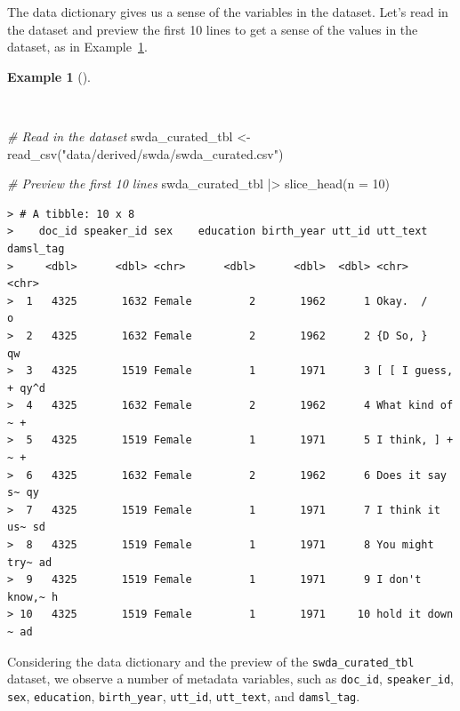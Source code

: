 \documentclass[
  letterpaper,
  DIV=11,
  numbers=noendperiod]{scrreport}
\newenvironment{Shaded}{\begin{snugshade}}{\end{snugshade}}
\newcommand{\AttributeTok}[1]{\textcolor[rgb]{0.00,0.00,0.00}{#1}}
\newcommand{\CommentTok}[1]{\textcolor[rgb]{0.00,0.00,0.00}{\textit{#1}}}
\newcommand{\DecValTok}[1]{\textcolor[rgb]{0.00,0.00,0.00}{#1}}
\newcommand{\FunctionTok}[1]{\textcolor[rgb]{0.00,0.00,0.00}{#1}}
\newcommand{\NormalTok}[1]{\textcolor[rgb]{0.00,0.00,0.00}{#1}}
\newcommand{\OtherTok}[1]{\textcolor[rgb]{0.00,0.00,0.00}{#1}}
\newcommand{\SpecialCharTok}[1]{\textcolor[rgb]{0.00,0.00,0.00}{#1}}
\newcommand{\StringTok}[1]{\textcolor[rgb]{0.00,0.00,0.00}{#1}}
\theoremstyle{definition}
\newtheorem{example}{Example}[chapter]
\theoremstyle{remark}
\begin{document}
The data dictionary gives us a sense of the variables in the dataset.
Let's read in the dataset and preview the first 10 lines to get a sense
of the values in the dataset, as in
Example~\ref{exm-td-swda-dataset-read-show}.

\begin{example}[]\protect\hypertarget{exm-td-swda-dataset-read-show}{}\label{exm-td-swda-dataset-read-show}

~

\begin{Shaded}
\begin{Highlighting}[]
\CommentTok{\# Read in the dataset}
\NormalTok{swda\_curated\_tbl }\OtherTok{\textless{}{-}}
  \FunctionTok{read\_csv}\NormalTok{(}\StringTok{"data/derived/swda/swda\_curated.csv"}\NormalTok{)}

\CommentTok{\# Preview the first 10 lines}
\NormalTok{swda\_curated\_tbl }\SpecialCharTok{|\textgreater{}}
  \FunctionTok{slice\_head}\NormalTok{(}\AttributeTok{n =} \DecValTok{10}\NormalTok{)}
\end{Highlighting}
\end{Shaded}

\begin{verbatim}
> # A tibble: 10 x 8
>    doc_id speaker_id sex    education birth_year utt_id utt_text       damsl_tag
>     <dbl>      <dbl> <chr>      <dbl>      <dbl>  <dbl> <chr>          <chr>    
>  1   4325       1632 Female         2       1962      1 Okay.  /       o        
>  2   4325       1632 Female         2       1962      2 {D So, }       qw       
>  3   4325       1519 Female         1       1971      3 [ [ I guess, + qy^d     
>  4   4325       1632 Female         2       1962      4 What kind of ~ +        
>  5   4325       1519 Female         1       1971      5 I think, ] + ~ +        
>  6   4325       1632 Female         2       1962      6 Does it say s~ qy       
>  7   4325       1519 Female         1       1971      7 I think it us~ sd       
>  8   4325       1519 Female         1       1971      8 You might try~ ad       
>  9   4325       1519 Female         1       1971      9 I don't know,~ h        
> 10   4325       1519 Female         1       1971     10 hold it down ~ ad
\end{verbatim}

\end{example}

Considering the data dictionary and the preview of the
\texttt{swda\_curated\_tbl} dataset, we observe a number of metadata
variables, such as \texttt{doc\_id}, \texttt{speaker\_id}, \texttt{sex},
\texttt{education}, \texttt{birth\_year}, \texttt{utt\_id},
\texttt{utt\_text}, and \texttt{damsl\_tag}.
\end{document}
